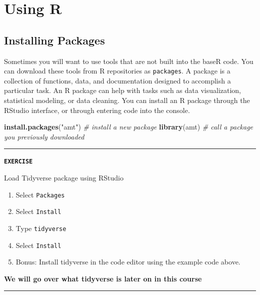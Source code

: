 \documentclass[
]{book}
\newenvironment{Shaded}{\begin{snugshade}}{\end{snugshade}}
\newcommand{\CommentTok}[1]{\textcolor[rgb]{0.56,0.35,0.01}{\textit{#1}}}
\newcommand{\FunctionTok}[1]{\textcolor[rgb]{0.13,0.29,0.53}{\textbf{#1}}}
\newcommand{\NormalTok}[1]{#1}
\newcommand{\StringTok}[1]{\textcolor[rgb]{0.31,0.60,0.02}{#1}}
\providecommand{\tightlist}{%
  \setlength{\itemsep}{0pt}\setlength{\parskip}{0pt}}
\begin{document}
\chapter{Using R}\label{using-r}

\section{Installing Packages}\label{packages}

Sometimes you will want to use tools that are not built into the baseR code. You can download these tools from R repositories as \texttt{packages}. A package is a collection of functions, data, and documentation designed to accomplish a particular task. An R package can help with tasks such as data visualization, statistical modeling, or data cleaning. You can install an R package through the RStudio interface, or through entering code into the console.

\begin{Shaded}
\begin{Highlighting}[]
\FunctionTok{install.packages}\NormalTok{(}\StringTok{"amt"}\NormalTok{) }\CommentTok{\# install a new package}
\FunctionTok{library}\NormalTok{(amt) }\CommentTok{\# call a package you previously downloaded}
\end{Highlighting}
\end{Shaded}

\begin{center}\rule{0.5\linewidth}{0.5pt}\end{center}

\textbf{\texttt{EXERCISE}}

Load Tidyverse package using RStudio

\begin{enumerate}
\def\labelenumi{\arabic{enumi}.}
\tightlist
\item
  Select \texttt{Packages}
\item
  Select \texttt{Install}
\item
  Type \texttt{tidyverse}
\item
  Select \texttt{Install}
\item
  Bonus: Install tidyverse in the code editor using the example code above.
\end{enumerate}

\textbf{We will go over what tidyverse is later on in this course}

\begin{center}\rule{0.5\linewidth}{0.5pt}\end{center}
\end{document}

